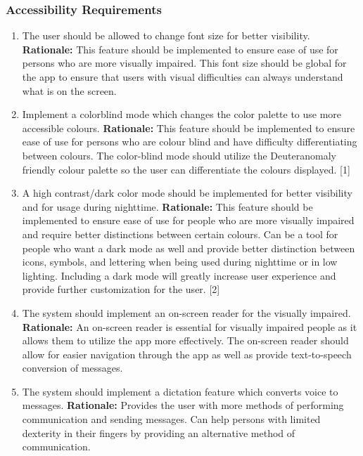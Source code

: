 \documentclass[]{article}
\begin{document}
\subsubsection{Accessibility Requirements}
\label{ssub:accessibility_requirements}
\begin{enumerate}[{UH-A}1. ]
	\item The user should be allowed to change font size for better visibility.\newline
	      \textbf{Rationale:} This feature should be implemented to ensure ease of use for persons who are more visually impaired. This font size should be global for the app to ensure that users with visual difficulties can always understand what is on the screen.
	\item Implement a colorblind mode which changes the color palette to use more accessible colours. \newline
	      \textbf{Rationale:} This feature should be implemented to ensure ease of use for persons who are colour blind and have difficulty differentiating between colours. The color-blind mode should utilize the Deuteranomaly friendly colour palette so the user can differentiate the colours displayed. [1]
	\item A high contrast/dark color mode should be implemented for better visibility and for usage during nighttime. \newline
	      \textbf{Rationale:} This feature should be implemented to ensure ease of use for people who are more visually impaired and require better distinctions between certain colours. Can be a tool for people who want a dark mode as well and provide better distinction between icons, symbols, and lettering when being used during nighttime or in low lighting. Including a dark mode will greatly increase user experience and provide further customization for the user. [2]

	\item The system should implement an on-screen reader for the visually impaired. \newline
	      \textbf{Rationale:} An on-screen reader is essential for visually impaired people as it allows them to utilize the app more effectively. The on-screen reader should allow for easier navigation through the app as well as provide text-to-speech conversion of messages.

	\item The system should implement a dictation feature which converts voice to messages. \newline
	      \textbf{Rationale:} Provides the user with more methods of performing communication and sending messages. Can help persons with limited dexterity in their fingers by providing an alternative method of communication.

\end{enumerate}
\end{document}
